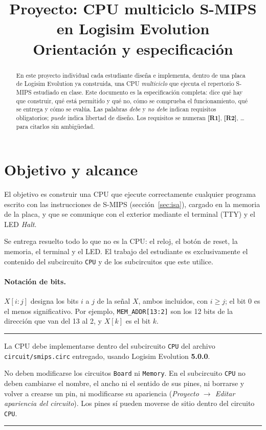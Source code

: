 \documentclass[11pt,a4paper]{article}
\title{Proyecto: CPU multiciclo S-MIPS en Logisim Evolution\\[4pt]\large Orientación y especificación}
\author{\curso}
\date{}
\newcommand{\sig}[1]{\texttt{#1}}
\newcommand{\req}[1]{\textbf{[#1]}}
\newenvironment{obligatorio}{\begin{center}\begin{minipage}{0.95\linewidth}\hrule\smallskip}{\smallskip\hrule\end{minipage}\end{center}}
\begin{document}
\maketitle

\begin{abstract}
\noindent En este proyecto individual cada estudiante diseña e implementa, dentro de una placa de Logisim Evolution ya construida, una CPU \emph{multiciclo} que ejecuta el repertorio S-MIPS estudiado en clase. Este documento es la especificación completa: dice qué hay que construir, qué está permitido y qué no, cómo se comprueba el funcionamiento, qué se entrega y cómo se evalúa. Las palabras \emph{debe} y \emph{no debe} indican requisitos obligatorios; \emph{puede} indica libertad de diseño. Los requisitos se numeran \req{R1}, \req{R2}, \ldots{} para citarlos sin ambigüedad.
\end{abstract}

\tableofcontents
\newpage

\section{Objetivo y alcance}

El objetivo es construir una CPU que ejecute correctamente cualquier programa escrito con las instrucciones de S-MIPS (sección~\ref{sec:isa}), cargado en la memoria de la placa, y que se comunique con el exterior mediante el terminal (TTY) y el LED \emph{Halt}.

Se entrega resuelto todo lo que no es la CPU: el reloj, el botón de reset, la memoria, el terminal y el LED. El trabajo del estudiante es exclusivamente el contenido del subcircuito \sig{CPU} y de los subcircuitos que este utilice.

\paragraph{Notación de bits.} $X[i{:}j]$ designa los bits $i$ a $j$ de la señal $X$, ambos incluidos, con $i \ge j$; el bit 0 es el menos significativo. Por ejemplo, \sig{MEM\_ADDR[13:2]} son los 12 bits de la dirección que van del 13 al 2, y $X[k]$ es el bit $k$.

\begin{obligatorio}
\begin{description}[leftmargin=1.2cm,style=nextline]
\item[\req{R1}] La CPU debe implementarse dentro del subcircuito \sig{CPU} del archivo \sig{circuit/smips.circ} entregado, usando Logisim Evolution \textbf{5.0.0}.
\item[\req{R2}] No deben modificarse los circuitos \sig{Board} ni \sig{Memory}. En el subcircuito \sig{CPU} no deben cambiarse el nombre, el ancho ni el sentido de sus pines, ni borrarse y volver a crearse un pin, ni modificarse su apariencia (\emph{Proyecto $\to$ Editar apariencia del circuito}). Los pines sí pueden moverse de sitio dentro del circuito \sig{CPU}.
\end{description}
\end{obligatorio}
\end{document}
